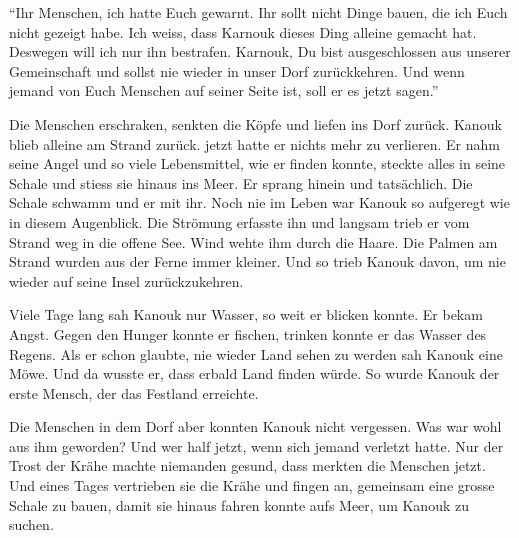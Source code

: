 \enquote{Ihr Menschen, ich hatte Euch gewarnt. Ihr sollt nicht Dinge bauen, die ich Euch nicht gezeigt habe. Ich weiss, dass Karnouk dieses Ding alleine gemacht hat. Deswegen will ich nur ihn bestrafen. Karnouk, Du bist ausgeschlossen aus unserer Gemeinschaft und sollst nie wieder in unser Dorf zurückkehren. Und wenn jemand von Euch Menschen auf seiner Seite ist, soll er es jetzt sagen.}

Die Menschen erschraken, senkten die Köpfe und liefen ins Dorf zurück. Kanouk blieb alleine am Strand zurück. jetzt hatte er nichts mehr zu verlieren. Er nahm seine Angel und so viele Lebensmittel, wie er finden konnte, steckte alles in seine Schale und stiess sie hinaus ins Meer. Er sprang hinein und tatsächlich. Die Schale schwamm und er mit ihr. Noch nie im Leben war Kanouk so aufgeregt wie in diesem Augenblick. Die Strömung erfasste ihn und langsam trieb er vom Strand weg in die offene See. Wind wehte ihm durch die Haare. Die Palmen am Strand wurden aus der Ferne immer kleiner. Und so trieb Kanouk davon, um nie wieder auf seine Insel zurückzukehren.

Viele Tage lang sah Kanouk nur Wasser, so weit er blicken konnte. Er bekam Angst. Gegen den Hunger konnte er fischen, trinken konnte er das Wasser des Regens. Als er schon glaubte, nie wieder Land sehen zu werden sah Kanouk eine Möwe. Und da wusste er, dass erbald Land finden würde. So wurde Kanouk der erste Mensch, der das Festland erreichte.

Die Menschen in dem Dorf aber konnten Kanouk nicht vergessen. Was war wohl aus ihm geworden? Und wer half jetzt, wenn sich jemand verletzt hatte. Nur der Trost der Krähe machte niemanden gesund, dass merkten die Menschen jetzt. Und eines Tages vertrieben sie die Krähe und fingen an, gemeinsam eine grosse Schale zu bauen, damit sie hinaus fahren konnte aufs Meer, um Kanouk zu suchen.
